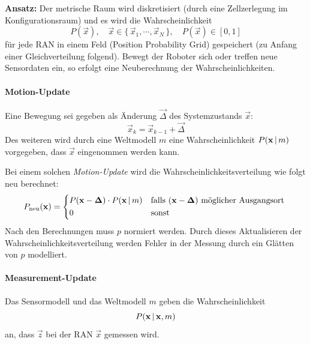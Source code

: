 				\textbf{Ansatz:} Der metrische Raum wird diskretisiert (\zB durch eine Zellzerlegung im Konfigurationsraum) und es wird die Wahrscheinlichkeit
				\begin{equation*}
					P(\vec{x}),\quad \vec{x} \in \{\, \vec{x}_1, \cdots, \vec{x}_N \,\},\quad P(\vec{x}) \in [0, 1]
				\end{equation*}
				für jede RAN in einem Feld (Position Probability Grid) gespeichert (zu Anfang einer Gleichverteilung folgend). Bewegt der Roboter sich oder treffen neue Sensordaten ein, so erfolgt eine Neuberechnung der Wahrscheinlichkeiten.
				
				\paragraph{Motion-Update}
					Eine Bewegung sei gegeben als Änderung \( \vec{\Delta} \) des Systemzustands \(\vec{x}\):
					\begin{equation*}
						\vec{x}_k = \vec{x}_{k - 1} + \vec{\Delta}
					\end{equation*}
					Des weiteren wird durch eine Weltmodell \(m\) eine Wahrscheinlichkeit \( P(\boldsymbol{\mathrm{x}} \,\vert\, m) \) vorgegeben, dass \(\vec{x}\) eingenommen werden kann.
					
					Bei einem solchen \emph{Motion-Update} wird die Wahrscheinlichkeitsverteilung wie folgt neu berechnet:
					\begin{equation*}
						P_\text{neu}(\vec{x}) =
							\begin{cases*}
								P(\vec{x} - \vec{\Delta}) \cdot P(\vec{x} \given m) & falls \( (\vec{x} - \vec{\Delta}) \) möglicher Ausgangsort \\
								0 & sonst
							\end{cases*}
					\end{equation*}
					Nach den Berechnungen muss \(p\) normiert werden. Durch dieses Aktualisieren der Wahrscheinlichkeitsverteilung werden Fehler in der Messung durch ein Glätten von \( p \) modelliert.
				
				\paragraph{Measurement-Update}
					Das Sensormodell und das Weltmodell \(m\) geben die Wahrscheinlichkeit
					\begin{equation*}
						P(\boldsymbol{\mathrm{x}} \,\vert\, \boldsymbol{\mathrm{x}}, m)
					\end{equation*}
					an, dass \( \vec{z} \) bei der RAN \( \vec{x} \) gemessen wird.
					
